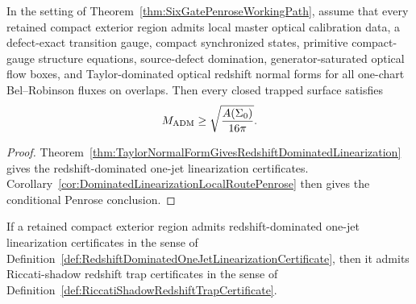 \begin{corollary}\label{cor:TaylorNormalFormLocalRoutePenrose}
In the setting of Theorem~\ref{thm:SixGatePenroseWorkingPath}, assume that
every retained compact exterior region admits local master optical calibration
data, a defect-exact transition gauge, compact synchronized states, primitive
compact-gauge structure equations, source-defect domination,
generator-saturated optical flow boxes, and Taylor-dominated optical redshift
normal forms for all one-chart Bel--Robinson fluxes on overlaps. Then every
closed trapped surface satisfies
\[
    M_{\mathrm{ADM}}\ge \sqrt{\frac{A(\Sigma_0)}{16\pi}} .
\]
\end{corollary}

\begin{proof}
Theorem~\ref{thm:TaylorNormalFormGivesRedshiftDominatedLinearization} gives the
redshift-dominated one-jet linearization certificates.  Corollary~\ref{cor:DominatedLinearizationLocalRoutePenrose}
then gives the conditional Penrose conclusion.
\end{proof}

\begin{theorem}\label{thm:RedshiftDominatedLinearizationGivesRiccatiShadow}
If a retained compact exterior region admits redshift-dominated one-jet
linearization certificates in the sense of
Definition~\ref{def:RedshiftDominatedOneJetLinearizationCertificate}, then it
admits Riccati-shadow redshift trap certificates in the sense of
Definition~\ref{def:RiccatiShadowRedshiftTrapCertificate}.
\end{theorem}

